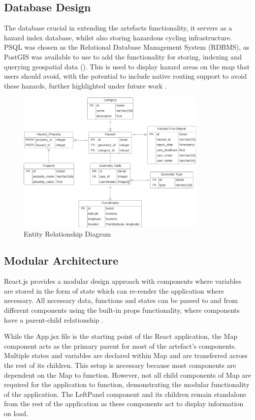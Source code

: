 \subsection{Database Design}
\label{system:database-design}

The database crucial in extending the artefacts functionality, it servers as a hazard index database, whilst also storing hazardous cycling infrastructure. PSQL was chosen as the Relational Database Management System (RDBMS), as PostGIS was available to use to add the functionality for storing, indexing and querying geospatial data (\cite{noauthor_postgis_nodate}). This is used to display hazard areas on the map that users should avoid, with the potential to include native routing support to avoid these hazards, further highlighted under future work  . 

\begin{figure}[!ht]
  \centering
  \includegraphics[width=350px]{figures/erd.png}
  \caption{Entity Relationship Diagram}
  \label{fig:erd}
\end{figure}

\subsection{Modular Architecture}
\label{system:modular-architecture}
React.js provides a modular design approach with components where variables are stored in the form of state which can re-render the application where necessary. All necessary data, functions and states can be passed to and from different components using the built-in props functionality, where components have a parent-child relationship .

While the App.jsx file is the starting point of the React application, the Map component acts as the primary parent for most of the artefact's components. Multiple states and variables are declared within Map and are transferred across the rest of its children. This setup is necessary because most components are dependent on the Map to function. However, not all child components of Map are required for the application to function, demonstrating the modular functionality of the application. The LeftPanel component and its children remain standalone from the rest of the application as these components act to display information on load.

